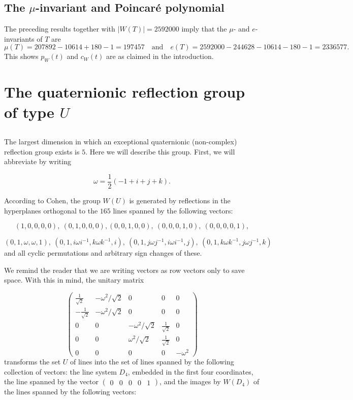 \documentclass[11pt, reqno]{amsart}
\numberwithin{equation}{section}
\theoremstyle{definition}
\theoremstyle{plain}
\begin{document}
\subsection{The $\mu$-invariant and Poincar\'e polynomial} 

The preceding results together with $|W(T)|=2592000$ imply that the $\mu$- and $e$-invariants of $T$ are
$$\mu(T)=207892-10614+180-1=197457 \quad \text{and} \quad e(T)=2592000-244628-10614-180-1=2336577.$$ This shows $p_W(t)$ and $c_W(t)$ are as claimed in the introduction.

\section{The quaternionic reflection group of type $U$}

\subsection{} The largest dimension in which an exceptional quaternionic (non-complex) reflection group exists is $5$. Here we will describe this group. First, we will abbreviate by writing

$$\omega=\frac{1}{2}(-1+i+j+k).$$

According to Cohen, the group $W(U)$ is generated by reflections in the hyperplanes orthogonal to the $165$ lines spanned by the following vectors:

$$(1,0,0,0,0), \ (0,1,0,0,0), (0,0,1,0,0), \ (0,0,0,1,0), \ (0,0,0,0,1),$$

$$(0,1,\omega,\omega,1), \ (0,1, i \omega i^{-1},k \omega k^{-1},i), \ (0,1, j \omega j^{-1}, i \omega i^{-1},j), \ (0,1,k \omega k^{-1},j \omega j^{-1},k)$$ and all cyclic permutations and arbitrary sign changes of these. 

We remind the reader that we are writing vectors as row vectors only to save space. With this in mind, the unitary matrix

$$\left( \begin{matrix} \frac{1}{\sqrt{2}} & -\omega^2/\sqrt{2} & 0 & 0 & 0 \\ 
- \frac{1}{\sqrt{2}} & -\omega^2/\sqrt{2} & 0 & 0 & 0 \\  
 0& 0  & -\omega^2/\sqrt{2} &  \frac{1}{\sqrt{2}} & 0 \\
 0& 0  & \omega^2/\sqrt{2} &  \frac{1}{\sqrt{2}} & 0 \\ 
 0 & 0 & 0 & 0 & -\omega^2 \end{matrix} \right) $$ transforms the set $U$ of lines into the set of lines spanned by the following collection of vectors: the line system $D_4$, embedded in the first four coordinates, the line spanned by the vector $\left( \begin{matrix} 0 & 0 & 0 & 0 & 1 \end{matrix} \right)$, and the images by $W(D_4)$ of the lines spanned by the following vectors:
 
\end{document}
